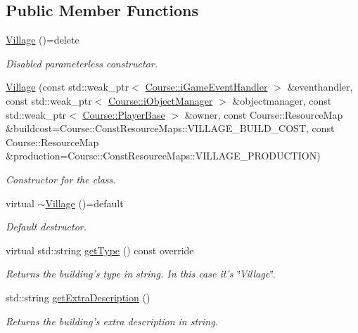 \subsection*{Public Member Functions}
\begin{DoxyCompactItemize}
\item 
\hypertarget{class_student_1_1_village_a5dc36130a7a03212c78560b9cc11a8b9}{\hyperlink{class_student_1_1_village_a5dc36130a7a03212c78560b9cc11a8b9}{Village} ()=delete}\label{class_student_1_1_village_a5dc36130a7a03212c78560b9cc11a8b9}

\begin{DoxyCompactList}\small\item\em Disabled parameterless constructor. \end{DoxyCompactList}\item 
\hyperlink{class_student_1_1_village_a242338705d4d6b031af1d82ce9fc7503}{Village} (const std\-::weak\-\_\-ptr$<$ \hyperlink{class_course_1_1i_game_event_handler}{Course\-::i\-Game\-Event\-Handler} $>$ \&eventhandler, const std\-::weak\-\_\-ptr$<$ \hyperlink{class_course_1_1i_object_manager}{Course\-::i\-Object\-Manager} $>$ \&objectmanager, const std\-::weak\-\_\-ptr$<$ \hyperlink{class_course_1_1_player_base}{Course\-::\-Player\-Base} $>$ \&owner, const Course\-::\-Resource\-Map \&buildcost=Course\-::\-Const\-Resource\-Maps\-::\-V\-I\-L\-L\-A\-G\-E\-\_\-\-B\-U\-I\-L\-D\-\_\-\-C\-O\-S\-T, const Course\-::\-Resource\-Map \&production=Course\-::\-Const\-Resource\-Maps\-::\-V\-I\-L\-L\-A\-G\-E\-\_\-\-P\-R\-O\-D\-U\-C\-T\-I\-O\-N)
\begin{DoxyCompactList}\small\item\em Constructor for the class. \end{DoxyCompactList}\item 
\hypertarget{class_student_1_1_village_ada3544b6f628001dc48b7199bf563d46}{virtual \hyperlink{class_student_1_1_village_ada3544b6f628001dc48b7199bf563d46}{$\sim$\-Village} ()=default}\label{class_student_1_1_village_ada3544b6f628001dc48b7199bf563d46}

\begin{DoxyCompactList}\small\item\em Default destructor. \end{DoxyCompactList}\item 
virtual std\-::string \hyperlink{class_student_1_1_village_a02b27bc84f9d250795ec2f9ff72fbe1b}{get\-Type} () const override
\begin{DoxyCompactList}\small\item\em Returns the building's type in string. In this case it's \char`\"{}\-Village\char`\"{}. \end{DoxyCompactList}\item 
std\-::string \hyperlink{class_student_1_1_village_acc186ea92b25b3b7852b457aa4880680}{get\-Extra\-Description} ()
\begin{DoxyCompactList}\small\item\em Returns the building's extra description in string. \end{DoxyCompactList}\end{DoxyCompactItemize}
